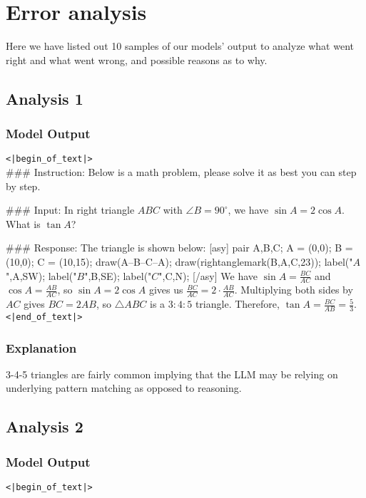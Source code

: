 \section{Error analysis}

Here we have listed out 10 samples of our models' output to analyze what went right and what went wrong, and possible reasons as to why.

\subsection{Analysis 1}
\subsubsection{Model Output}
\texttt{<|begin\_of\_text|>} \\

\#\#\# Instruction: Below is a math problem, please solve it as best you can step by step.

\#\#\# Input: In right triangle $ABC$ with $\angle B = 90^\circ$, we have $\sin A = 2\cos A$.  What is $\tan A$?

\#\#\# Response: The triangle is shown below: [asy] pair A,B,C; A = (0,0); B = (10,0); C = (10,15); draw(A--B--C--A); draw(rightanglemark(B,A,C,23)); label("$A$",A,SW); label("$B$",B,SE); label("$C$",C,N); [/asy] We have $\sin A = \frac{BC}{AC}$ and $\cos A = \frac{AB}{AC}$, so $\sin A = 2\cos A$ gives us $\frac{BC}{AC} = 2\cdot \frac{AB}{AC}$.  Multiplying both sides by $AC$ gives $BC = 2AB$, so $\triangle ABC$ is a $3:4:5$ triangle.  Therefore, $\tan A = \frac{BC}{AB} = \boxed{\frac{5}{3}}$. 
\\\texttt{<|end\_of\_text|>} 

\subsubsection{Explanation}
3-4-5 triangles are fairly common implying that the LLM may be relying on underlying pattern matching as opposed to reasoning. 

\subsection{Analysis 2}
\subsubsection{Model Output}
\texttt{<|begin\_of\_text|>} \\

